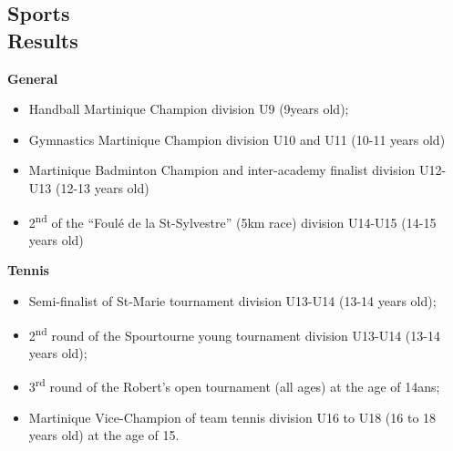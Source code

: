 \documentclass[margin]{res}
\begin{document}
\begin{resume}

  \section{Sports \\Results}
  
  {\bf General}
  \begin{itemize} \itemsep -2pt %
  \item Handball Martinique Champion division U9 (9years old);
  \item Gymnastics Martinique Champion division U10 and U11 (10-11 years old)
  \item Martinique Badminton Champion and inter-academy finalist division U12-U13 (12-13 years old)
  \item 2\textsuperscript{nd} of the ``Foul\'e de la St-Sylvestre'' (5km race) division U14-U15 (14-15 years old)
  \end{itemize}

  {\bf Tennis}
  \begin{itemize} \itemsep -2pt %

  \item Semi-finalist of St-Marie tournament division U13-U14 (13-14 years old);
  \item 2\textsuperscript{nd} round of the Spourtourne young tournament division U13-U14 (13-14 years old);
  \item 3\textsuperscript{rd} round of the Robert’s open tournament (all ages) at the age of 14ans;
  \item Martinique Vice-Champion of team tennis division U16 to U18 (16 to 18 years old) at the age of 15.
  \end{itemize}


\end{resume} 
\end{document}

